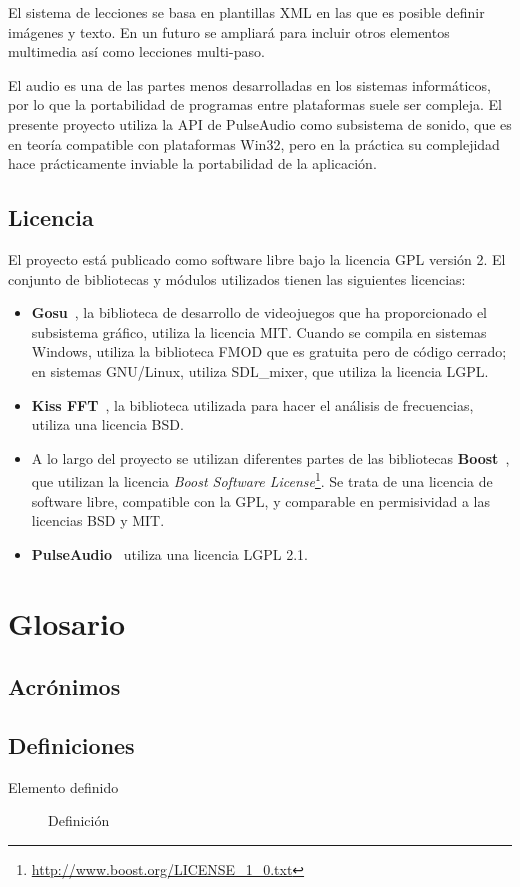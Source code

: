 El sistema de lecciones se basa en plantillas XML en las que es
posible definir imágenes y texto. En un futuro se ampliará para
incluir otros elementos multimedia así como lecciones multi-paso.

El audio es una de las partes menos desarrolladas en los sistemas
informáticos, por lo que la portabilidad de programas entre
plataformas suele ser compleja. El presente proyecto utiliza la API de
PulseAudio como subsistema de sonido, que es en teoría compatible con
plataformas Win32, pero en la práctica su complejidad hace
prácticamente inviable la portabilidad de la aplicación.

\subsection{Licencia}
El proyecto está publicado como software libre bajo la licencia
\ac{GPL} versión 2. El conjunto de bibliotecas y módulos utilizados
tienen las siguientes licencias:
\begin{itemize}
\item \textbf{Gosu}~\cite{gosu}, la biblioteca de desarrollo de videojuegos que ha
  proporcionado el subsistema gráfico, utiliza la licencia
  \ac{MIT}. Cuando se compila en sistemas Windows, utiliza la biblioteca
  FMOD que es gratuita pero de código cerrado; en sistemas GNU/Linux,
  utiliza SDL\_mixer, que utiliza la licencia \ac{LGPL}.
\item \textbf{Kiss FFT}~\cite{kissfft}, la biblioteca utilizada para
  hacer el análisis de frecuencias, utiliza una licencia \ac{BSD}.
\item A lo largo del proyecto se utilizan diferentes partes de las
  bibliotecas \textbf{Boost}~\cite{boost}, que utilizan la licencia \textit{Boost Software
    License}\footnote{\url{http://www.boost.org/LICENSE_1_0.txt}}. Se
  trata de una licencia de software libre, compatible con la GPL, y
  comparable en permisividad a las licencias BSD y MIT.
\item \textbf{PulseAudio}~\cite{pulseaudio} utiliza una licencia LGPL 2.1.
\end{itemize}

\section{Glosario}

\subsection{Acrónimos}



\subsection{Definiciones}

\begin{description}
\item[Elemento definido] 
  Definición
\end{description}
